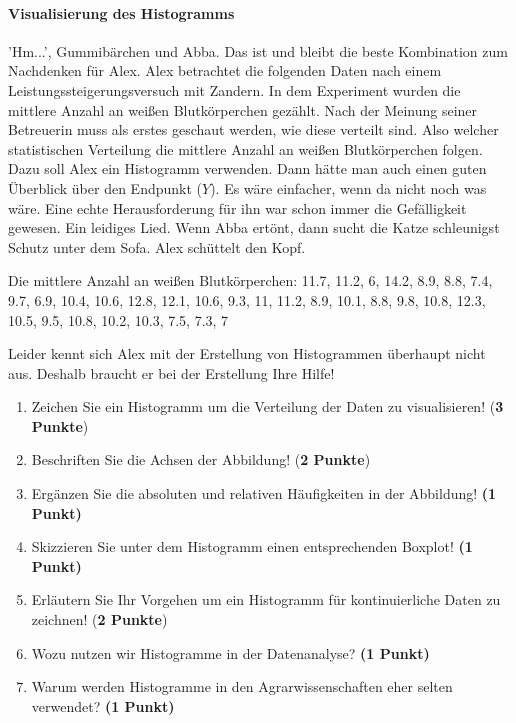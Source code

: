 \documentclass[a4paper, 9pt]{scrartcl}\usepackage[]{graphicx}\usepackage[]{xcolor}
\begin{document}
\ifcollection
\paragraph{Visualisierung des Histogramms}
\fi

'Hm...', Gummibärchen und Abba. Das ist und bleibt die beste Kombination zum Nachdenken für Alex. Alex betrachtet die folgenden Daten nach einem Leistungssteigerungsversuch mit Zandern. In dem Experiment wurden die mittlere Anzahl an weißen Blutkörperchen gezählt. Nach der Meinung seiner Betreuerin muss als erstes geschaut werden, wie diese verteilt sind. Also welcher statistischen Verteilung die mittlere Anzahl an weißen Blutkörperchen folgen. Dazu soll Alex ein Histogramm verwenden. Dann hätte man auch einen guten Überblick über den Endpunkt ($Y$). Es wäre einfacher, wenn da nicht noch was wäre. Eine echte Herausforderung für ihn war schon immer die Gefälligkeit gewesen. Ein leidiges Lied. Wenn Abba ertönt, dann sucht die Katze schleunigst Schutz unter dem Sofa. Alex schüttelt den Kopf.

\begin{center}
Die mittlere Anzahl an weißen Blutkörperchen: 11.7, 11.2, 6, 14.2, 8.9, 8.8, 7.4, 9.7, 6.9, 10.4, 10.6, 12.8, 12.1, 10.6, 9.3, 11, 11.2, 8.9, 10.1, 8.8, 9.8, 10.8, 12.3, 10.5, 9.5, 10.8, 10.2, 10.3, 7.5, 7.3, 7
\end{center}

Leider kennt sich Alex mit der Erstellung von Histogrammen überhaupt nicht aus. Deshalb braucht er bei der Erstellung Ihre Hilfe!

\begin{enumerate}
\item Zeichen Sie ein Histogramm um die Verteilung der Daten zu visualisieren! (\textbf{3 Punkte})
\item Beschriften Sie die Achsen der Abbildung! (\textbf{2 Punkte})
\item Ergänzen Sie die absoluten und relativen Häufigkeiten in der Abbildung! \textbf{(1 Punkt)}
\item Skizzieren Sie unter dem Histogramm einen entsprechenden Boxplot! \textbf{(1 Punkt)}
\item Erläutern Sie Ihr Vorgehen um ein Histogramm für kontinuierliche Daten zu zeichnen! (\textbf{2 Punkte})
\item Wozu nutzen wir Histogramme in der Datenanalyse? \textbf{(1 Punkt)} 
\item Warum werden Histogramme in den Agrarwissenschaften eher selten verwendet? \textbf{(1 Punkt)}
\end{enumerate}
\end{document}
